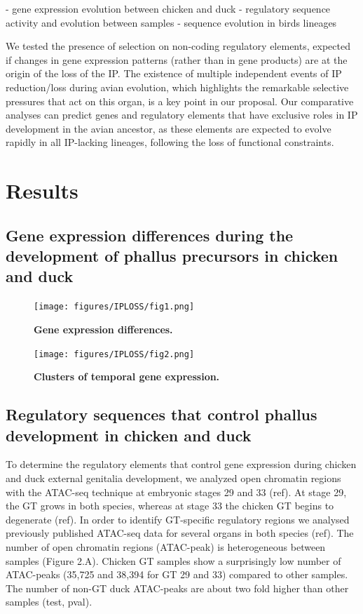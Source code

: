 - gene expression evolution between chicken and duck
- regulatory sequence activity and evolution between samples
- sequence evolution in birds lineages

We tested the presence  of  selection  on  non-coding  regulatory  elements,  expected  if  changes  in  gene  expression  patterns  (rather than in gene products) are at the origin of the loss of the IP. The existence of multiple independent events of IP reduction/loss during avian evolution, which highlights the remarkable selective pressures that act on this organ, is a key point in our proposal. Our comparative analyses can predict genes and regulatory elements that have exclusive roles in IP development in the avian ancestor, as these elements are expected to evolve rapidly in all IP-lacking lineages, following the loss of functional constraints. \\

\section{Results}

\subsection{Gene expression differences during the development of phallus precursors in chicken and duck}

\begin{figure}[h]
    \centering
    \texttt{[image: figures/IPLOSS/fig1.png]}
    \caption[Gene expression differences.]{
    \textbf{Gene expression differences.}\\
    }
    \label{fig:IPLOSS-fig1}
\end{figure} 

\begin{figure}[h]
    \centering
    \texttt{[image: figures/IPLOSS/fig2.png]}
    \caption[Clusters of temporal gene expression.]{
    \textbf{Clusters of temporal gene expression.}\\
    }
    \label{fig:IPLOSS-fig2}
\end{figure} 


\subsection{Regulatory sequences that control phallus development in chicken and duck}

To determine the regulatory elements that control gene expression during chicken and duck external genitalia development, we analyzed open chromatin regions with the ATAC-seq technique at embryonic stages 29 and 33 (ref). At stage 29, the GT grows in both species, whereas at stage 33 the chicken GT begins to degenerate (ref). In order to identify GT-specific regulatory regions we analysed previously published ATAC-seq data for several organs in both species (ref). The number of open chromatin regions (ATAC-peak) is heterogeneous between samples (Figure 2.A). Chicken GT samples show a surprisingly low number of ATAC-peaks (35,725 and 38,394 for GT 29 and 33) compared to other samples. The number of non-GT duck ATAC-peaks are about two fold higher than other samples (test, pval). \\


